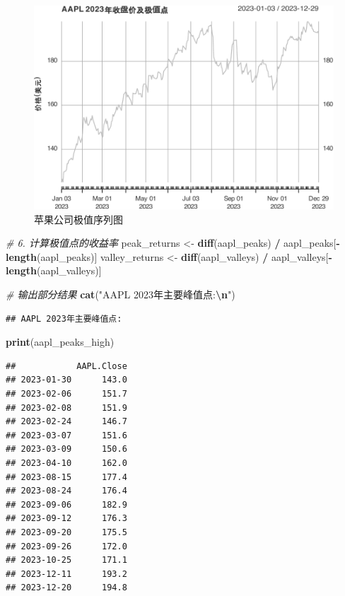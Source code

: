 \documentclass[]{ctexbook}
\newenvironment{Shaded}{\begin{snugshade}}{\end{snugshade}}
\newcommand{\CommentTok}[1]{\textcolor[rgb]{0.56,0.35,0.01}{\textit{#1}}}
\newcommand{\FunctionTok}[1]{\textcolor[rgb]{0.13,0.29,0.53}{\textbf{#1}}}
\newcommand{\NormalTok}[1]{#1}
\newcommand{\OtherTok}[1]{\textcolor[rgb]{0.56,0.35,0.01}{#1}}
\newcommand{\SpecialCharTok}[1]{\textcolor[rgb]{0.81,0.36,0.00}{\textbf{#1}}}
\newcommand{\StringTok}[1]{\textcolor[rgb]{0.31,0.60,0.02}{#1}}
\begin{document}
\begin{figure}
\includegraphics[width=0.9\linewidth]{quantmod_files/figure-latex/peak-1} \caption{苹果公司极值序列图}\label{fig:peak}
\end{figure}

\begin{Shaded}
\begin{Highlighting}[]
\CommentTok{\# 6. 计算极值点的收益率}
\NormalTok{peak\_returns }\OtherTok{\textless{}{-}} \FunctionTok{diff}\NormalTok{(aapl\_peaks) }\SpecialCharTok{/}\NormalTok{ aapl\_peaks[}\SpecialCharTok{{-}}\FunctionTok{length}\NormalTok{(aapl\_peaks)]}
\NormalTok{valley\_returns }\OtherTok{\textless{}{-}} \FunctionTok{diff}\NormalTok{(aapl\_valleys) }\SpecialCharTok{/}\NormalTok{ aapl\_valleys[}\SpecialCharTok{{-}}\FunctionTok{length}\NormalTok{(aapl\_valleys)]}

\CommentTok{\# 输出部分结果}
\FunctionTok{cat}\NormalTok{(}\StringTok{"AAPL 2023年主要峰值点:}\SpecialCharTok{\textbackslash{}n}\StringTok{"}\NormalTok{)}
\end{Highlighting}
\end{Shaded}

\begin{verbatim}
## AAPL 2023年主要峰值点:
\end{verbatim}

\begin{Shaded}
\begin{Highlighting}[]
\FunctionTok{print}\NormalTok{(aapl\_peaks\_high)}
\end{Highlighting}
\end{Shaded}

\begin{verbatim}
##            AAPL.Close
## 2023-01-30      143.0
## 2023-02-06      151.7
## 2023-02-08      151.9
## 2023-02-24      146.7
## 2023-03-07      151.6
## 2023-03-09      150.6
## 2023-04-10      162.0
## 2023-08-15      177.4
## 2023-08-24      176.4
## 2023-09-06      182.9
## 2023-09-12      176.3
## 2023-09-20      175.5
## 2023-09-26      172.0
## 2023-10-25      171.1
## 2023-12-11      193.2
## 2023-12-20      194.8
\end{verbatim}
\end{document}
